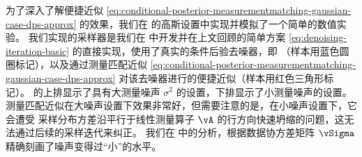\documentclass[../../book-main_zh.tex]{subfiles}
\begin{document}
为了深入了解便捷近似
\eqref{eq:conditional-posterior-measurementmatching-gaussian-case-dps-approx} 的效果，我们在  的高斯设置中实现并模拟了一个简单的数值实验。
我们实现的采样器是我们在  中开发并在上文回顾的简单方案
\eqref{eq:denoising-iteration-basic} 的直接实现，使用了真实的条件后验去噪器，即
（样本用蓝色圆圈标记），以及通过测量匹配近似
\eqref{eq:conditional-posterior-measurementmatching-gaussian-case-dps-approx}
对该去噪器进行的便捷近似（样本用红色三角形标记）。
 的上排显示了具有大测量噪声 $\sigma^2$ 的设置，下排显示了小测量噪声的设置。
测量匹配近似在大噪声设置下效果非常好，但需要注意的是，在小噪声设置下，它会遭受
采样分布方差沿平行于线性测量算子 $\vA$ 的行方向快速坍缩的问题，这无法通过后续的采样迭代来纠正。
我们在  中的分析，根据数据协方差矩阵 $\vSigma$ 精确刻画了噪声变得过“小”的水平。
\end{document}
